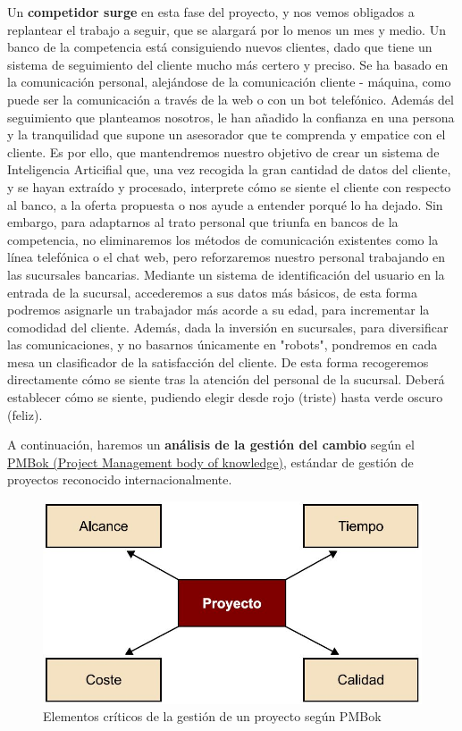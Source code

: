 \documentclass{article}
\begin{document}
Un \textbf{competidor surge} en esta fase del proyecto, y nos vemos obligados a replantear el trabajo a seguir, que se alargará por lo menos un mes y medio. Un banco de la competencia está consiguiendo nuevos clientes, dado que tiene un sistema de seguimiento del cliente mucho más certero y preciso. Se ha basado en la comunicación personal, alejándose de la comunicación cliente - máquina, como puede ser la comunicación a través de la web o con un bot telefónico. Además del seguimiento que planteamos nosotros, le han añadido la confianza en una persona y la tranquilidad que supone un asesorador que te comprenda y empatice con el cliente. Es por ello, que mantendremos nuestro objetivo de crear un sistema de Inteligencia Articifial que, una vez recogida la gran cantidad de datos del cliente, y se hayan extraído y procesado, interprete cómo se siente el cliente con respecto al banco, a la oferta propuesta o nos ayude a entender porqué lo ha dejado. Sin embargo, para adaptarnos al trato personal que triunfa en bancos de la competencia, no eliminaremos los métodos de comunicación existentes como la línea telefónica o el chat web, pero reforzaremos nuestro personal trabajando en las sucursales bancarias. Mediante un sistema de identificación del usuario en la entrada de la sucursal, accederemos a sus datos más básicos, de esta forma podremos asignarle un trabajador más acorde a su edad, para incrementar la comodidad del cliente. Además, dada la inversión en sucursales, para diversificar las comunicaciones, y no basarnos únicamente en "robots", pondremos en cada mesa un clasificador de la satisfacción del cliente. De esta forma recogeremos directamente cómo se siente tras la atención del personal de la sucursal. Deberá establecer cómo se siente, pudiendo elegir desde rojo (triste) hasta verde oscuro (feliz).

A continuación, haremos un \textbf{análisis de la gestión del cambio} según el \href{https://www.pmi.org/pmbok-guide-standards/foundational/pmbok}{PMBok (Project Management body of knowledge)}, estándar de gestión de proyectos reconocido internacionalmente.

\begin{figure}[h]
	\centering
	\includegraphics[scale=0.5]{PMBoK}
	\caption{Elementos críticos de la gestión de un proyecto según PMBok}
	\label{PMBoK}
\end{figure}
\end{document}

